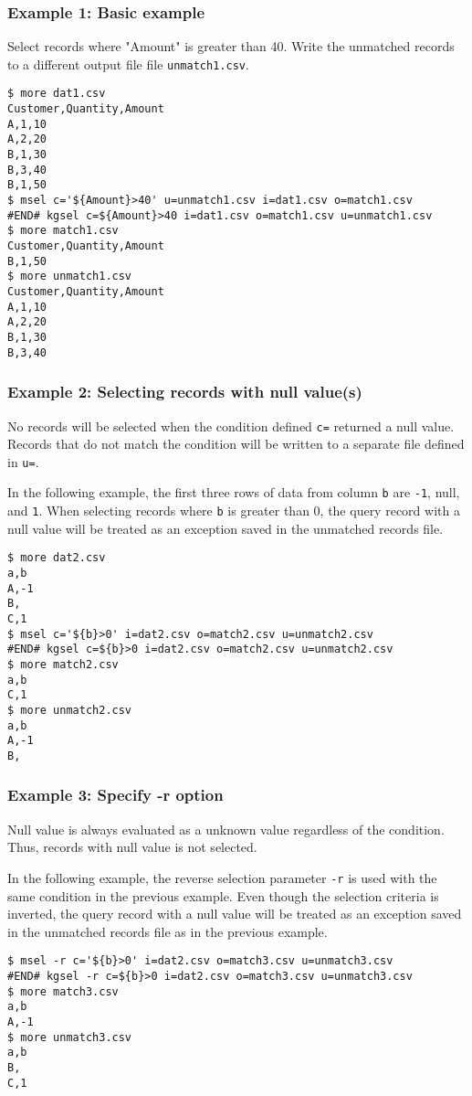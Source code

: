 \subsubsection*{Example 1: Basic example}

Select records where "Amount" is greater than 40. Write the unmatched records to a different output file file \verb|unmatch1.csv|.


\begin{Verbatim}[baselinestretch=0.7,frame=single]
$ more dat1.csv
Customer,Quantity,Amount
A,1,10
A,2,20
B,1,30
B,3,40
B,1,50
$ msel c='${Amount}>40' u=unmatch1.csv i=dat1.csv o=match1.csv
#END# kgsel c=${Amount}>40 i=dat1.csv o=match1.csv u=unmatch1.csv
$ more match1.csv
Customer,Quantity,Amount
B,1,50
$ more unmatch1.csv
Customer,Quantity,Amount
A,1,10
A,2,20
B,1,30
B,3,40
\end{Verbatim}
\subsubsection*{Example 2: Selecting records with null value(s)}

No records will be selected when the condition defined \verb|c=| returned a null value. Records that do not match the condition will be written to a separate file defined in \verb|u=|. 
 
In the following example, the first three rows of data from column \verb|b| are \verb|-1|, null, and \verb|1|. When selecting records where \verb|b| is greater than 0, the query record with a null value will be treated as an exception saved in the unmatched records file. 


\begin{Verbatim}[baselinestretch=0.7,frame=single]
$ more dat2.csv
a,b
A,-1
B,
C,1
$ msel c='${b}>0' i=dat2.csv o=match2.csv u=unmatch2.csv
#END# kgsel c=${b}>0 i=dat2.csv o=match2.csv u=unmatch2.csv
$ more match2.csv
a,b
C,1
$ more unmatch2.csv
a,b
A,-1
B,
\end{Verbatim}
\subsubsection*{Example 3: Specify -r option}

Null value is always evaluated as a unknown value regardless of the condition. Thus,  records with null value is not selected.

In the following example, the reverse selection parameter \verb|-r| is used with the same condition in the previous example. Even though the selection criteria is inverted, the query record with a null value will be treated as an exception saved in the unmatched records file as in the previous example.


\begin{Verbatim}[baselinestretch=0.7,frame=single]
$ msel -r c='${b}>0' i=dat2.csv o=match3.csv u=unmatch3.csv
#END# kgsel -r c=${b}>0 i=dat2.csv o=match3.csv u=unmatch3.csv
$ more match3.csv
a,b
A,-1
$ more unmatch3.csv
a,b
B,
C,1
\end{Verbatim}

